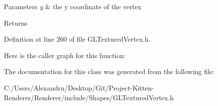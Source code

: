\begin{DoxyParams}{Parameters}
{\em y} & the y coordinate of the vertex \\
\hline
\end{DoxyParams}
\begin{DoxyReturn}{Returns}

\end{DoxyReturn}


Definition at line 260 of file G\+L\+Textured\+Vertex.\+h.



Here is the caller graph for this function\+:




The documentation for this class was generated from the following file\+:\begin{DoxyCompactItemize}
\item 
C\+:/\+Users/\+Alexandru/\+Desktop/\+Git/\+Project-\/\+Kitten-\/\+Renderer/\+Renderer/include/\+Shapes/G\+L\+Textured\+Vertex.\+h\end{DoxyCompactItemize}
